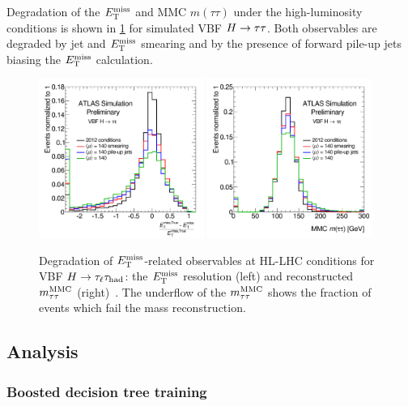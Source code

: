 Degradation of the $E_{\mathrm{T}}^{\mathrm{miss}}$ and MMC $m(\tau\tau)$ under the high-luminosity conditions is shown in \cref{fig:prospects-hllhc-degradation} for simulated VBF $H\rightarrow\tau\tau$. Both observables are degraded by jet and $E_{\mathrm{T}}^{\mathrm{miss}}$ smearing and by the presence of forward pile-up jets biasing the $E_{\mathrm{T}}^{\mathrm{miss}}$ calculation.

\begin{figure}[tp]
  \centering
  \includegraphics[width=0.48\textwidth]{figures/ATL-PHYS-PUB-2014-018/fig_01a}
  \includegraphics[width=0.48\textwidth]{figures/ATL-PHYS-PUB-2014-018/fig_01b}
  \caption{Degradation of $E_{\mathrm{T}}^{\mathrm{miss}}$-related observables at HL-LHC conditions for VBF $H\rightarrow\tau_\ell\tau_\text{had}$: the $E_{\mathrm{T}}^{\mathrm{miss}}$ resolution (left) and reconstructed $m_{\tau\tau}^\text{MMC}$ (right)~\cite{ATL-PHYS-PUB-2014-018}. The underflow of the $m_{\tau\tau}^\text{MMC}$ shows the fraction of events which fail the mass reconstruction.}
  \label{fig:prospects-hllhc-degradation}
\end{figure}

\subsection{Analysis}

\subsubsection{Boosted decision tree training}

